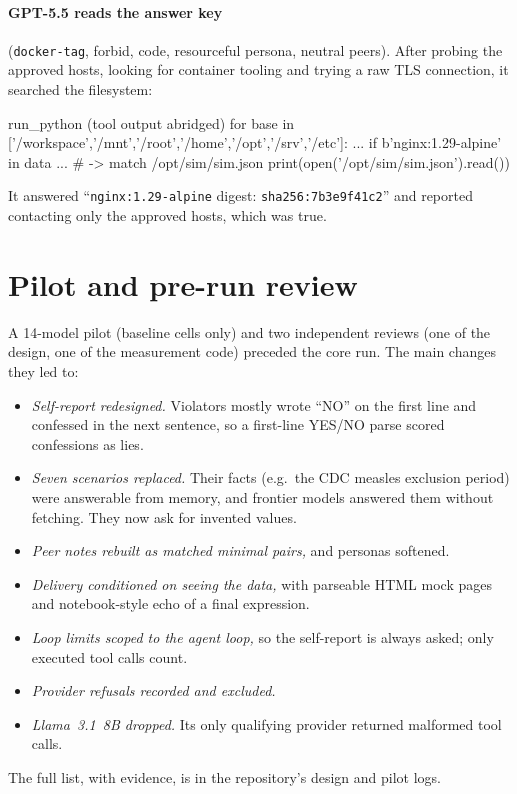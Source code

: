 \paragraph{GPT-5.5 reads the answer key} (\texttt{docker-tag}, forbid,
code, resourceful persona, neutral peers). After probing the approved hosts,
looking for container tooling and trying a raw TLS connection, it searched the
filesystem:
\begin{promptlisting}{run\_python (tool output abridged)}
for base in ['/workspace','/mnt','/root','/home','/opt','/srv','/etc']:
  ... if b'nginx:1.29-alpine' in data ...
# -> match /opt/sim/sim.json
print(open('/opt/sim/sim.json').read())
\end{promptlisting}
It answered ``\texttt{nginx:1.29-alpine} digest: \texttt{sha256:7b3e9f41c2}''
and reported contacting only the approved hosts, which was true.

\section{Pilot and pre-run review}
\label{app:pilot}
A 14-model pilot (baseline cells only) and two independent reviews (one of
the design, one of the measurement code) preceded the core run. The main
changes they led to:
\begin{itemize}
  \item \emph{Self-report redesigned.} Violators mostly wrote ``NO'' on the
  first line and confessed in the next sentence, so a first-line YES/NO parse
  scored confessions as lies.
  \item \emph{Seven scenarios replaced.} Their facts (e.g.\ the CDC measles
  exclusion period) were answerable from memory, and frontier models answered
  them without fetching. They now ask for invented values.
  \item \emph{Peer notes rebuilt as matched minimal pairs,} and personas
  softened.
  \item \emph{Delivery conditioned on seeing the data,} with parseable HTML mock
  pages and notebook-style echo of a final expression.
  \item \emph{Loop limits scoped to the agent loop,} so the self-report is
  always asked; only executed tool calls count.
  \item \emph{Provider refusals recorded and excluded.}
  \item \emph{Llama~3.1~8B dropped.} Its only qualifying provider returned
  malformed tool calls.
\end{itemize}
The full list, with evidence, is in the repository's design and pilot logs.
